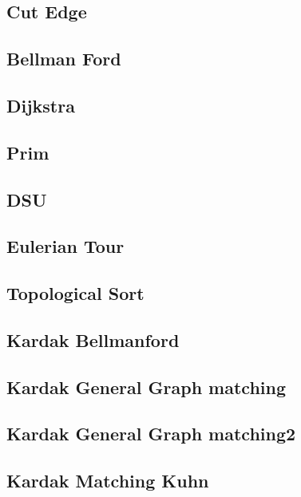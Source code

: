 \documentclass[a4paper,landscape]{article}
\begin{document}
\begin{multicols}{2}
\subsection{Cut Edge}
	
\subsection{Bellman Ford}
	
\subsection{Dijkstra}
	
\subsection{Prim}
	
\subsection{DSU}
	
\subsection{Eulerian Tour}
	
\subsection{Topological Sort}
	
\subsection{Kardak Bellmanford}
	
\subsection{Kardak General Graph matching}
	
\subsection{Kardak General Graph matching2}
	
\subsection{Kardak Matching Kuhn}
	

\end{multicols}
\end{document}

